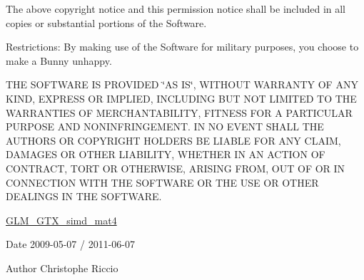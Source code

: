 The above copyright notice and this permission notice shall be included in all copies or substantial portions of the Software.

Restrictions\-: By making use of the Software for military purposes, you choose to make a Bunny unhappy.

T\-H\-E S\-O\-F\-T\-W\-A\-R\-E I\-S P\-R\-O\-V\-I\-D\-E\-D \char`\"{}\-A\-S I\-S\char`\"{}, W\-I\-T\-H\-O\-U\-T W\-A\-R\-R\-A\-N\-T\-Y O\-F A\-N\-Y K\-I\-N\-D, E\-X\-P\-R\-E\-S\-S O\-R I\-M\-P\-L\-I\-E\-D, I\-N\-C\-L\-U\-D\-I\-N\-G B\-U\-T N\-O\-T L\-I\-M\-I\-T\-E\-D T\-O T\-H\-E W\-A\-R\-R\-A\-N\-T\-I\-E\-S O\-F M\-E\-R\-C\-H\-A\-N\-T\-A\-B\-I\-L\-I\-T\-Y, F\-I\-T\-N\-E\-S\-S F\-O\-R A P\-A\-R\-T\-I\-C\-U\-L\-A\-R P\-U\-R\-P\-O\-S\-E A\-N\-D N\-O\-N\-I\-N\-F\-R\-I\-N\-G\-E\-M\-E\-N\-T. I\-N N\-O E\-V\-E\-N\-T S\-H\-A\-L\-L T\-H\-E A\-U\-T\-H\-O\-R\-S O\-R C\-O\-P\-Y\-R\-I\-G\-H\-T H\-O\-L\-D\-E\-R\-S B\-E L\-I\-A\-B\-L\-E F\-O\-R A\-N\-Y C\-L\-A\-I\-M, D\-A\-M\-A\-G\-E\-S O\-R O\-T\-H\-E\-R L\-I\-A\-B\-I\-L\-I\-T\-Y, W\-H\-E\-T\-H\-E\-R I\-N A\-N A\-C\-T\-I\-O\-N O\-F C\-O\-N\-T\-R\-A\-C\-T, T\-O\-R\-T O\-R O\-T\-H\-E\-R\-W\-I\-S\-E, A\-R\-I\-S\-I\-N\-G F\-R\-O\-M, O\-U\-T O\-F O\-R I\-N C\-O\-N\-N\-E\-C\-T\-I\-O\-N W\-I\-T\-H T\-H\-E S\-O\-F\-T\-W\-A\-R\-E O\-R T\-H\-E U\-S\-E O\-R O\-T\-H\-E\-R D\-E\-A\-L\-I\-N\-G\-S I\-N T\-H\-E S\-O\-F\-T\-W\-A\-R\-E.

\hyperlink{group__gtx__simd__mat4}{G\-L\-M\-\_\-\-G\-T\-X\-\_\-simd\-\_\-mat4}

\begin{DoxyDate}{Date}
2009-\/05-\/07 / 2011-\/06-\/07 
\end{DoxyDate}
\begin{DoxyAuthor}{Author}
Christophe Riccio 
\end{DoxyAuthor}
